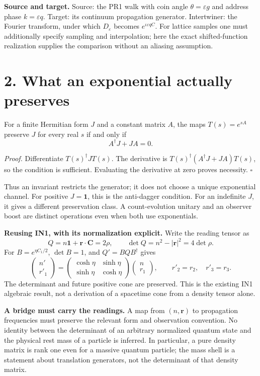 \documentclass[11pt,a4paper]{article}
\newcommand{\ii}{\iota}\newcommand{\id}{\mathbf1}\newcommand{\dd}{\mathrm d}\newcommand{\tr}{\operatorname{Tr}}
\begin{document}
\textbf{Source and target.} Source: the PR1 walk with coin angle $\theta=\varepsilon g$ and address phase $k=\varepsilon q$. Target: its continuum propagation generator. Intertwiner: the Fourier transform, under which $D_\varepsilon$ becomes $e^{\ii\varepsilon qC}$. For lattice samples one must additionally specify sampling and interpolation; here the exact shifted-function realization supplies the comparison without an aliasing assumption.

\newpage
\section*{2. What an exponential actually preserves}
\begin{proposition}
For a finite Hermitian form $J$ and a constant matrix $A$, the maps $T(s)=e^{sA}$ preserve $J$ for every real $s$ if and only if
\[
A^\dagger J+JA=0.
\]
\end{proposition}
\textit{Proof.} Differentiate $T(s)^\dagger JT(s)$. The derivative is $T(s)^\dagger(A^\dagger J+JA)T(s)$, so the condition is sufficient. Evaluating the derivative at zero proves necessity. $\square$

Thus an invariant restricts the generator; it does not choose a unique exponential channel. For positive $J=\id$, this is the anti-dagger condition. For an indefinite $J$, it gives a different preservation class. A count-evolution unitary and an observer boost are distinct operations even when both use exponentials.

\textbf{Reusing IN1, with its normalization explicit.} Write the reading tensor as
\[
Q=n\id+\mathbf r\cdot\mathbf C=2\rho,
\qquad \det Q=n^2-|\mathbf r|^2=4\det\rho.
\]
For $B=e^{\eta C_1/2}$, $\det B=1$, and $Q'=BQB^\dagger$ gives
\[
\begin{pmatrix}n'\\r'_1\end{pmatrix}
=\begin{pmatrix}\cosh\eta&\sinh\eta\\\sinh\eta&\cosh\eta\end{pmatrix}
\begin{pmatrix}n\\r_1\end{pmatrix},\qquad r'_2=r_2,\quad r'_3=r_3.
\]
The determinant and future positive cone are preserved. This is the existing IN1 algebraic result, not a derivation of a spacetime cone from a density tensor alone.

\textbf{A bridge must carry the readings.} A map from $(n,\mathbf r)$ to propagation frequencies must preserve the relevant form and observation convention. No identity between the determinant of an arbitrary normalized quantum state and the physical rest mass of a particle is inferred. In particular, a pure density matrix is rank one even for a massive quantum particle; the mass shell is a statement about translation generators, not the determinant of that density matrix.
\end{document}
